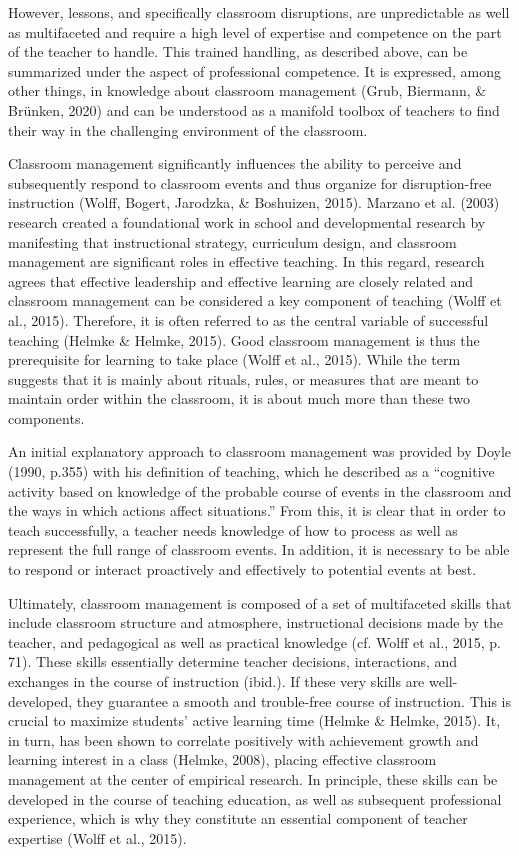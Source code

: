 \documentclass[
  man]{apa6}
\begin{document}
However, lessons, and specifically classroom disruptions, are unpredictable as well as multifaceted and require a high level of expertise and competence on the part of the teacher to handle. This trained handling, as described above, can be summarized under the aspect of professional competence. It is expressed, among other things, in knowledge about classroom management (Grub, Biermann, \& Brünken, 2020) and can be understood as a manifold toolbox of teachers to find their way in the challenging environment of the classroom.

Classroom management significantly influences the ability to perceive and subsequently respond to classroom events and thus organize for disruption-free instruction (Wolff, Bogert, Jarodzka, \& Boshuizen, 2015). Marzano et al. (2003) research created a foundational work in school and developmental research by manifesting that instructional strategy, curriculum design, and classroom management are significant roles in effective teaching. In this regard, research agrees that effective leadership and effective learning are closely related and classroom management can be considered a key component of teaching (Wolff et al., 2015). Therefore, it is often referred to as the central variable of successful teaching (Helmke \& Helmke, 2015). Good classroom management is thus the prerequisite for learning to take place (Wolff et al., 2015). While the term suggests that it is mainly about rituals, rules, or measures that are meant to maintain order within the classroom, it is about much more than these two components.

An initial explanatory approach to classroom management was provided by Doyle (1990, p.355) with his definition of teaching, which he described as a ``cognitive activity based on knowledge of the probable course of events in the classroom and the ways in which actions affect situations.'' From this, it is clear that in order to teach successfully, a teacher needs knowledge of how to process as well as represent the full range of classroom events. In addition, it is necessary to be able to respond or interact proactively and effectively to potential events at best.

Ultimately, classroom management is composed of a set of multifaceted skills that include classroom structure and atmosphere, instructional decisions made by the teacher, and pedagogical as well as practical knowledge (cf. Wolff et al., 2015, p. 71). These skills essentially determine teacher decisions, interactions, and exchanges in the course of instruction (ibid.). If these very skills are well-developed, they guarantee a smooth and trouble-free course of instruction. This is crucial to maximize students' active learning time (Helmke \& Helmke, 2015). It, in turn, has been shown to correlate positively with achievement growth and learning interest in a class (Helmke, 2008), placing effective classroom management at the center of empirical research. In principle, these skills can be developed in the course of teaching education, as well as subsequent professional experience, which is why they constitute an essential component of teacher expertise (Wolff et al., 2015).
\end{document}
